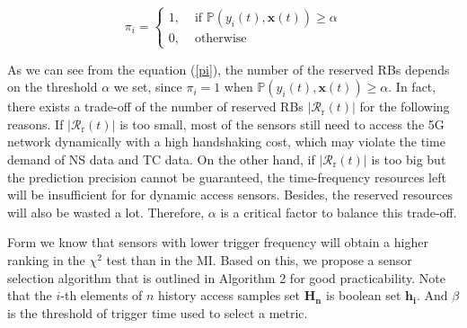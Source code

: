 \documentclass{SCIS2021}
\begin{document}
	\setlength\abovedisplayskip{-16pt}
	\begin{center}
		\begin{equation}
			\label{pi}
			\pi_{i}=\left\{\begin{array}{ll}1, & \text { if } \mathbb{P}(y_{i}(t), \bm{x}(t)) \geq \alpha \\0, & \text { otherwise }
			\end{array}\right.
		\end{equation}
	\end{center}
	\setlength\belowdisplayskip{-8pt}

	\par {\color{blue}As we can see from the equation (\ref{pi}), the number of the reserved RBs depends on the threshold $\alpha$ we set, since $\pi_{i}=1$ when $\mathbb{P}(y_{i}(t), \bm{x}(t)) \geq \alpha$. In fact, there exists a trade-off of the number of reserved RBs $\left|\mathcal{R}_\mathrm{r}(t)\right|$ for the following reasons. If $\left|\mathcal{R}_\mathrm{r}(t)\right|$ is too small, most of the sensors still need to access the 5G network dynamically with a high handshaking cost, which may violate the time demand of NS data and TC data. On the other hand, if $\left|\mathcal{R}_\mathrm{r}(t)\right|$ is too big but the prediction precision cannot be guaranteed, the time-frequency resources left will be insufficient for for dynamic access sensors. Besides, the reserved resources will also be wasted a lot. Therefore, $\alpha$ is a critical factor to balance this trade-off.}

	\par Form\cite{li2018predictive} we know that sensors with lower trigger frequency will obtain a higher ranking in the $\chi^{2}$ test than in the MI. Based on this, we propose a sensor selection algorithm that is outlined in Algorithm 2 for good practicability. Note that the $i$-th elements of $n$ history access samples set $\bm{H_{n}}$ is boolean set $\bm{h_{i}}$. And $\beta$ is the threshold of trigger time used to select a metric.
\end{document}
